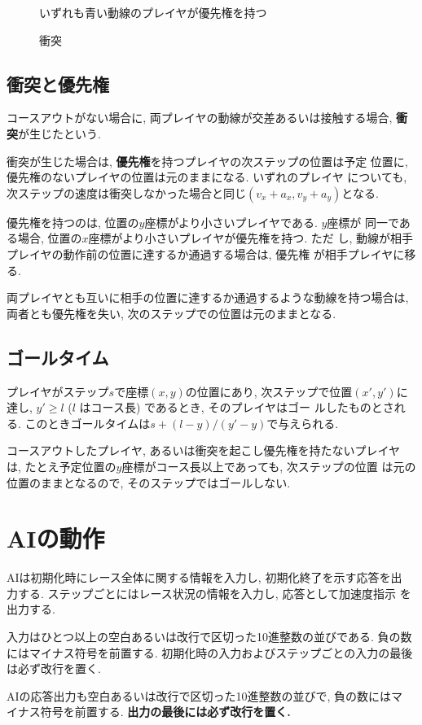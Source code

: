 \documentclass[11pt]{jarticle}
\begin{document}
\begin{figure}
  \caption{衝突}
  \label{fig:collision}
  いずれも青い動線のプレイヤが優先権を持つ
  \vspace{-1.5cm}
\end{figure}

\subsection{衝突と優先権}
コースアウトがない場合に, 両プレイヤの動線が交差あるいは接触する場合,
{\bf 衝突}が生じたという.

衝突が生じた場合は, {\bf 優先権}を持つプレイヤの次ステップの位置は予定
位置に, 優先権のないプレイヤの位置は元のままになる.  いずれのプレイヤ
についても, 次ステップの速度は衝突しなかった場合と同じ$(v_x+a_x,
v_y+a_y)$となる.

優先権を持つのは, 位置の$y$座標がより小さいプレイヤである.  $y$座標が
同一である場合, 位置の$x$座標がより小さいプレイヤが優先権を持つ. ただ
し, 動線が相手プレイヤの動作前の位置に達するか通過する場合は, 優先権
が相手プレイヤに移る.

両プレイヤとも互いに相手の位置に達するか通過するような動線を持つ場合は,
両者とも優先権を失い, 次のステップでの位置は元のままとなる.

\subsection{ゴールタイム}
プレイヤがステップ$s$で座標$(x, y)$の位置にあり, 次ステップで位置$(x',
y')$に達し, $y'\ge l$ ($l$ はコース長) であるとき, そのプレイヤはゴー
ルしたものとされる.  このときゴールタイムは$s + (l-y)/(y'-y)$で与えられる.

コースアウトしたプレイヤ, あるいは衝突を起こし優先権を持たないプレイヤ
は, たとえ予定位置の$y$座標がコース長以上であっても, 次ステップの位置
は元の位置のままとなるので, そのステップではゴールしない.

\section{AIの動作}
AIは初期化時にレース全体に関する情報を入力し, 初期化終了を示す応答を出
力する. ステップごとにはレース状況の情報を入力し, 応答として加速度指示
を出力する.

入力はひとつ以上の空白あるいは改行で区切った10進整数の並びである.
負の数にはマイナス符号を前置する.
初期化時の入力およびステップごとの入力の最後は必ず改行を置く.

AIの応答出力も空白あるいは改行で区切った10進整数の並びで, 負の数にはマ
イナス符号を前置する.  {\bf 出力の最後には必ず改行を置く.}
\end{document}
